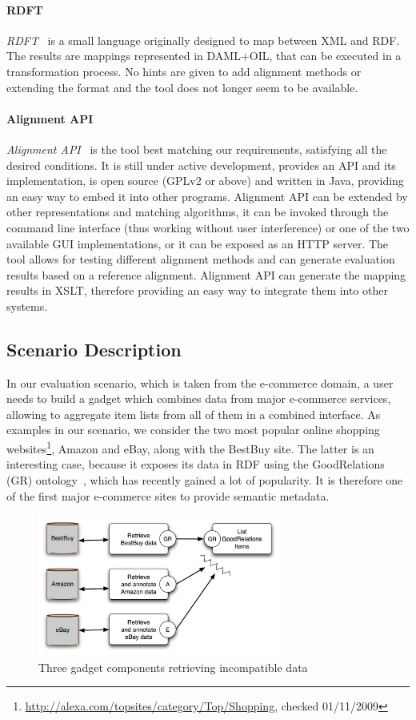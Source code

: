 \paragraph{RDFT} \emph{RDFT}~\cite{omelayenko2002rdft} is a small language originally designed to map between XML and RDF. The results are mappings represented in DAML+OIL, that can be executed in a transformation process. No hints are given to add alignment methods or extending the format and the tool does not longer seem to be available. 
\paragraph{Alignment API} \emph{Alignment API}~\cite{euzenat2004api} is the tool best matching our requirements, satisfying all the desired conditions. It is still under active development, provides an API and its implementation, is open source (GPLv2 or above) and written in Java, providing an easy way to embed it into other programs. Alignment API can be extended by other representations and matching algorithms, it can be invoked through the command line interface (thus working without user interference) or one of the two available GUI implementations, or it can be exposed as an HTTP server. The tool allows for testing different alignment methods and can generate evaluation results based on a reference alignment. Alignment API can generate the mapping results in XSLT, therefore providing an easy way to integrate them into other systems.

\subsection{Scenario Description}
\label{scenario}

In our evaluation scenario, which is taken from the e-commerce domain, a user needs to build a gadget which combines data from major e-commerce services, allowing to aggregate item lists from all of them in a combined interface.
As examples in our scenario, we consider the two most popular online shopping websites\footnote{\url{http://alexa.com/topsites/category/Top/Shopping}, checked 01/11/2009}, Amazon and eBay, along with the BestBuy site. The latter is an interesting case, because it exposes its data in RDF using the GoodRelations (GR) ontology~\cite{hepp-goodrelations}, which has recently gained a lot of popularity. It is therefore one of the first major e-commerce sites to provide semantic metadata.

\begin{figure}
    \centering
        \includegraphics[width=8cm]{images/screens_diagram.png}%
        \caption{Three gadget components retrieving incompatible data}
    \label{fig:screens}
\end{figure}

